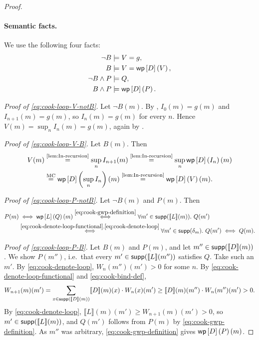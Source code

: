 \begin{proof}
\paragraph{Semantic facts.}
We use the following four facts:
\begin{align}
  \neg B&\models V=g,
  \label{eq:cook-loop-V-notB}\\
  B&\models V=\mathsf{wp}\left[{D}\right]\left({V}\right),
  \label{eq:cook-loop-V-B}\\
  \neg B\land P&\models Q,
  \label{eq:cook-loop-P-notB}\\
  B\land P&\models\mathsf{wp}\left[{D}\right]\left({P}\right).
  \label{eq:cook-loop-P-B}
\end{align}

\noindent\emph{Proof of \eqref{eq:cook-loop-V-notB}.}
Let $\neg B(m)$.  By , $I_0(m)=g(m)$ and
$I_{n+1}(m)=g(m)$, so $I_n(m)=g(m)$ for every $n$.  Hence
$V(m)=\sup_n I_n(m)=g(m)$, again by .

\noindent\emph{Proof of \eqref{eq:cook-loop-V-B}.}
Let $B(m)$.  Then
\[
  \begin{aligned}
  V(m)
  &\overset{\text{\Cref{lem:In-recursion}}}{=}
  \sup_n I_{n+1}(m)
  \overset{\text{\Cref{lem:In-recursion}}}{=}
  \sup_n\WP{D}{I_n}(m)\\
  &\overset{\text{MC}}{=}
  \WP{D}{\sup_n I_n}(m)
  \overset{\text{\Cref{lem:In-recursion}}}{=}
  \WP{D}{V}(m).
  \end{aligned}
\]

\noindent\emph{Proof of \eqref{eq:cook-loop-P-notB}.}
Let $\neg B(m)$ and $P(m)$.  Then
\[
  \begin{aligned}
  P(m)
  &\iff
  \WP{L}{Q}(m)
  \overset{\eqref{eq:cook-gwp-definition}}{\iff}
  \forall m'\in\supp(\llbracket L\rrbracket(m)).\ Q(m')\\
  &\overset{\eqref{eq:cook-denote-loop-functional},\eqref{eq:cook-denote-loop}}{\iff}
  \forall m'\in\supp(\delta_m).\ Q(m')
  \iff
  Q(m).
  \end{aligned}
\]

\noindent\emph{Proof of \eqref{eq:cook-loop-P-B}.}
Let $B(m)$ and $P(m)$, and let $m''\in\mathsf{supp}(\llbracket D\rrbracket(m))$.  We
show $P(m'')$, i.e.\ that every $m'\in\mathsf{supp}(\llbracket L\rrbracket(m''))$
satisfies $Q$.  Take such an $m'$.  By \eqref{eq:cook-denote-loop},
$W_n(m'')(m')>0$ for some $n$.  By \eqref{eq:cook-denote-loop-functional} and
\eqref{eq:cook-bind-def},
\[
  W_{n+1}(m)(m')
  =\sum_{x\in\mathsf{supp}(\llbracket D\rrbracket(m))}
    \llbracket D\rrbracket(m)(x)\cdot W_n(x)(m')
  \geq\llbracket D\rrbracket(m)(m'')\cdot W_n(m'')(m')
  >0.
\]
By \eqref{eq:cook-denote-loop},
$\llbracket L\rrbracket(m)(m')\geq W_{n+1}(m)(m')>0$, so
$m'\in\mathsf{supp}(\llbracket L\rrbracket(m))$, and $Q(m')$ follows from $P(m)$ by
\eqref{eq:cook-gwp-definition}.  As $m''$ was arbitrary,
\eqref{eq:cook-gwp-definition} gives $\mathsf{wp}\left[{D}\right]\left({P}\right)(m)$.


\end{proof}

